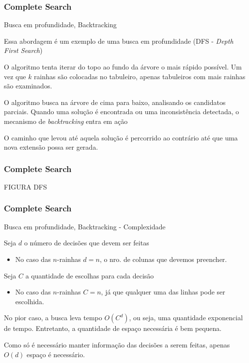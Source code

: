 \begin{frame}
\frametitle{Complete Search}

\begin{block}{Busca em profundidade, Backtracking}

\begin{itemize}
	\bitem Essa abordagem é um exemplo de uma busca em profundidade (DFS - \emph{Depth First Search})
	\begin{itemize}
		\bitem O algoritmo tenta iterar do topo ao fundo da árvore o mais rápido possível.
		\bitem Um vez que $k$ rainhas são colocadas no tabuleiro, apenas tabuleiros com mais rainhas são examinados.
	\end{itemize}
	\bitem O algoritmo busca na árvore de cima para baixo, analisando os candidatos parciais.
	\bitem Quando uma solução é encontrada ou uma inconsistência detectada, o mecanismo de \emph{backtracking} entra em ação
	\begin{itemize}
		\bitem O caminho que levou até aquela solução é percorrido ao contrário até que uma nova extensão possa ser gerada.
	\end{itemize}
\end{itemize}
\end{block}
\end{frame}

\begin{frame}
\frametitle{Complete Search}
\huge FIGURA DFS
\end{frame}

\begin{frame}
\frametitle{Complete Search}

\begin{block}{Busca em profundidade, Backtracking - Complexidade}

\begin{itemize}
	\bitem Seja $d$ o número de decisões que devem ser feitas 
	\begin{itemize}
		\item[] \scriptsize{No caso das $n$-rainhas $d=n$, o nro. de colunas que devemos preencher.}
	\end{itemize}
	\bitem Seja $C$ a quantidade de escolhas para cada decisão
	\begin{itemize}
		\item[] \scriptsize{No caso das $n$-rainhas $C=n$, já que qualquer uma das linhas pode ser escolhida.}
	\end{itemize}
	\bitem No pior caso, a busca leva tempo $O(C^d)$, ou seja, uma quantidade exponencial de tempo.
	\bitem Entretanto, a quantidade de espaço necessária é bem pequena.
	\begin{itemize}
		\bitem Como só é necessário manter informação das decisões a serem feitas, apenas $O(d)$ espaço é necessário.
	\end{itemize}
\end{itemize}
\end{block}
\end{frame}

